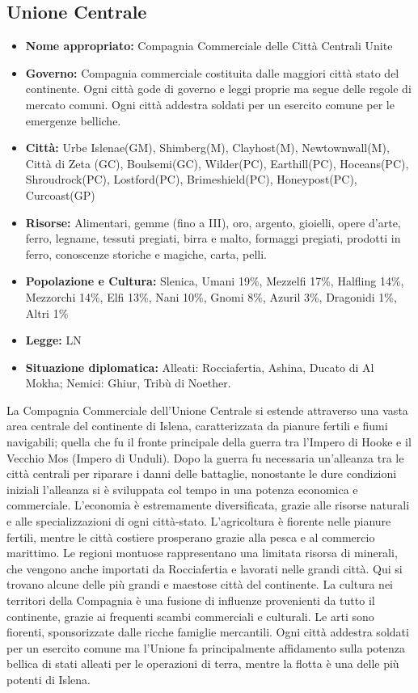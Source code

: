 \documentclass[10pt, a4paper]{report}
\begin{document}
\begin{multicols}{2}
\subsection*{Unione Centrale}
\begin{itemize}
	\item \textbf{Nome appropriato:} Compagnia Commerciale delle Città Centrali Unite
	\item \textbf{Governo:} Compagnia commerciale costituita dalle maggiori città stato del continente. Ogni città gode di governo e leggi proprie ma segue delle regole di mercato comuni. Ogni città addestra soldati per un esercito comune per le emergenze belliche.
	\item \textbf{Città:} Urbe Islenae(GM), Shimberg(M), Clayhost(M), Newtownwall(M), Città di Zeta (GC), Boulsemi(GC), Wilder(PC), Earthill(PC), Hoceans(PC), Shroudrock(PC), Lostford(PC), Brimeshield(PC), Honeypost(PC), Curcoast(GP)
	\item \textbf{Risorse:} Alimentari, gemme (fino a III), oro, argento, gioielli, opere d'arte, ferro, legname, tessuti pregiati, birra e malto, formaggi pregiati, prodotti in ferro, conoscenze storiche e magiche, carta, pelli.
	\item \textbf{Popolazione e Cultura:} Slenica, Umani 19\%, Mezzelfi 17\%, Halfling 14\%, Mezzorchi 14\%, Elfi 13\%, Nani 10\%, Gnomi 8\%, Azuril 3\%, Dragonidi 1\%, Altri 1\%
	\item \textbf{Legge:} LN
	\item \textbf{Situazione diplomatica:} Alleati: Rocciafertia, Ashina, Ducato di Al Mokha; Nemici: Ghiur, Tribù di Noether.
\end{itemize}
La Compagnia Commerciale dell'Unione Centrale si estende attraverso una vasta area centrale del continente di Islena, caratterizzata da pianure fertili e fiumi navigabili; quella che fu il fronte principale della guerra tra l'Impero di Hooke e il Vecchio Mos (Impero di Unduli). Dopo la guerra fu necessaria un'alleanza tra le città centrali per riparare i danni delle battaglie, nonostante le dure condizioni iniziali l'alleanza si è sviluppata col tempo in una potenza economica e commerciale.
L'economia è estremamente diversificata, grazie alle risorse naturali e alle specializzazioni di ogni città-stato. L'agricoltura è fiorente nelle pianure fertili, mentre le città costiere prosperano grazie alla pesca e al commercio marittimo. Le regioni montuose rappresentano una limitata risorsa di minerali, che vengono anche importati da Rocciafertia e lavorati nelle grandi città. Qui si trovano alcune delle più grandi e maestose città del continente. La cultura nei territori della Compagnia è una fusione di influenze provenienti da tutto il continente, grazie ai frequenti scambi commerciali e culturali. Le arti sono fiorenti, sponsorizzate dalle ricche famiglie mercantili. Ogni città addestra soldati per un esercito comune ma l'Unione fa principalmente affidamento sulla potenza bellica di stati alleati per le operazioni di terra, mentre la flotta è una delle più potenti di Islena.


\end{multicols}
\end{document}
